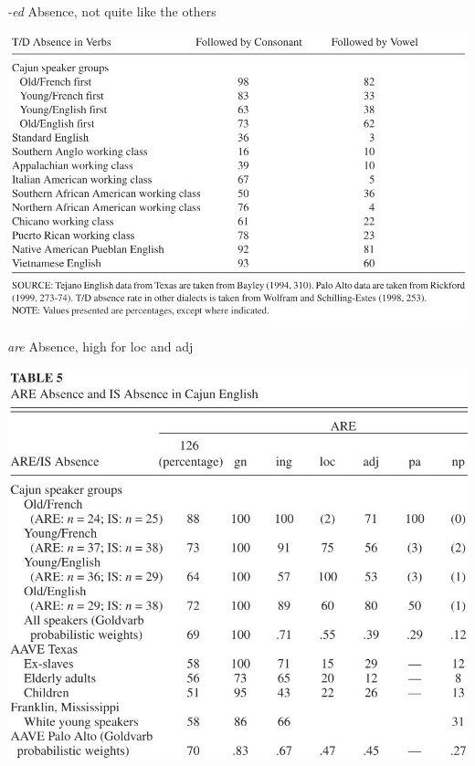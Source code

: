 \documentclass{beamer}
\begin{document}
    \begin{frame}{\emph{-ed} Absence, not quite like the others}
      \begin{center}
        \includegraphics[scale=0.65]{ed_absence.jpg}
      \end{center}
    \end{frame}

    \begin{frame}{\emph{are} Absence, high for loc and adj}
      \begin{center}
        \includegraphics[scale=0.55]{are_absence.jpg}
      \end{center}
    \end{frame}
\end{document}
